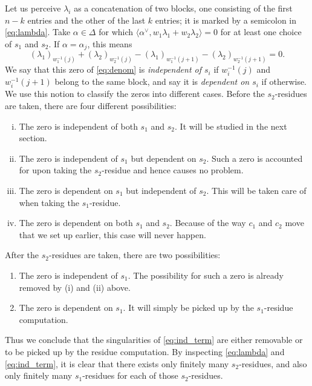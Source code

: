 \documentclass[11pt]{amsart}
\numberwithin{theorem}{section}
\numberwithin{equation}{section}
\theoremstyle{remark}
\theoremstyle{definition}
\newcommand{\re}{\mathrm{Re}\,}
\begin{document}
{Let us perceive $\lambda_i$ as a concatenation of two blocks, one consisting of the first $n-k$ entries and the other of the last $k$ entries; it is marked by a semicolon in \eqref{eq:lambda}. Take $\alpha \in \Delta$ for which $\langle \alpha^\vee, w_1\lambda_1 + w_2\lambda_2 \rangle = 0$ for at least one choice of $s_1$ and $s_2$. If $\alpha = \alpha_j$, this means
\begin{equation*}
(\lambda_1)_{w_1^{-1}(j)} + (\lambda_2)_{w_2^{-1}(j)} - (\lambda_1)_{w_1^{-1}(j+1)} - (\lambda_2)_{w_2^{-1}(j+1)} = 0.
\end{equation*}
We say that this zero of \eqref{eq:denom} is \emph{independent of $s_i$} if $w_i^{-1}(j)$ and $w_i^{-1}(j+1)$ belong to the same block, and say it is \emph{dependent on $s_i$} if otherwise. We use this notion to classify the zeros into different cases. Before the $s_2$-residues are taken, there are four different possibilities:
\begin{enumerate}[(i)]
\item The zero is independent of both $s_1$ and $s_2$. It will be studied in the next section.

\item The zero is independent of $s_1$ but dependent on $s_2$. Such a zero is accounted for upon taking the $s_2$-residue and hence causes no problem.

\item The zero is dependent on $s_1$ but independent of $s_2$. This will be taken care of when taking the $s_1$-residue.

\item The zero is dependent on both $s_1$ and $s_2$. Because of the way $c_1$ and $c_2$ move that we set up earlier, this case will never happen.
\end{enumerate}
After the $s_2$-residues are taken, there are two possibilities:
\begin{enumerate}
\item[(v)] The zero is independent of $s_1$. The possibility for such a zero is already removed by (i) and (ii) above.

\item[(vi)] The zero is dependent on $s_1$. It will simply be picked up by the $s_1$-residue computation.
\end{enumerate}

Thus we conclude that the singularities of \eqref{eq:ind_term} are either removable or to be picked up by the residue computation. By inspecting \eqref{eq:lambda} and \eqref{eq:ind_term}, it is clear that there exists only finitely many $s_2$-residues, and also only finitely many $s_1$-residues for each of those $s_2$-residues.


}
\end{document}

